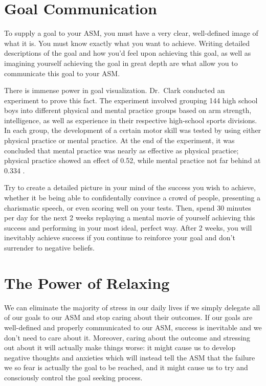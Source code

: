 \documentclass[
]{book}
\begin{document}
\hypertarget{goal-communication}{%
\section{Goal Communication}\label{goal-communication}}

To supply a goal to your ASM, you must have a very clear, well-defined image of what it is. You must know exactly what you want to achieve. Writing detailed descriptions of the goal and how you'd feel upon achieving this goal, as well as imagining yourself achieving the goal in great depth are what allow you to communicate this goal to your ASM.

There is immense power in goal visualization. Dr.~Clark conducted an experiment to prove this fact. The experiment involved grouping 144 high school boys into different physical and mental practice groups based on arm strength, intelligence, as well as experience in their respective high-school sports divisions. In each group, the development of a certain motor skill was tested by using either physical practice or mental practice. At the end of the experiment, it was concluded that mental practice was nearly as effective as physical practice; physical practice showed an effect of 0.52, while mental practice not far behind at 0.334 \citep{visualization}.

Try to create a detailed picture in your mind of the success you wish to achieve, whether it be being able to confidentally convince a crowd of people, presenting a charismatic speech, or even scoring well on your tests. Then, spend 30 minutes per day for the next 2 weeks replaying a mental movie of yourself achieving this success and performing in your most ideal, perfect way. After 2 weeks, you will inevitably achieve success if you continue to reinforce your goal and don't surrender to negative beliefs.

\hypertarget{the-power-of-relaxing}{%
\section{The Power of Relaxing}\label{the-power-of-relaxing}}

We can eliminate the majority of stress in our daily lives if we simply delegate all of our goals to our ASM and stop caring about their outcomes. If our goals are well-defined and properly communicated to our ASM, success is inevitable and we don't need to care about it. Moreover, caring about the outcome and stressing out about it will actually make things worse: it might cause us to develop negative thoughts and anxieties which will instead tell the ASM that the failure we so fear is actually the goal to be reached, and it might cause us to try and consciously control the goal seeking process.
\end{document}
